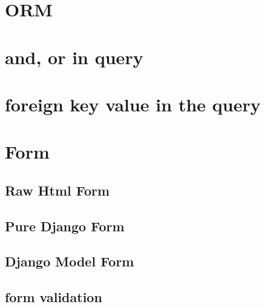 \documentclass{article}
\begin{document}
	\section{ORM}
		\section{and, or in query}
		\section{foreign key value in the query}
	\section{Form} 
		\subsection{Raw Html Form}
		\subsection{Pure Django Form}
		\subsection{Django Model Form}
		\subsection{form validation}
\end{document}
